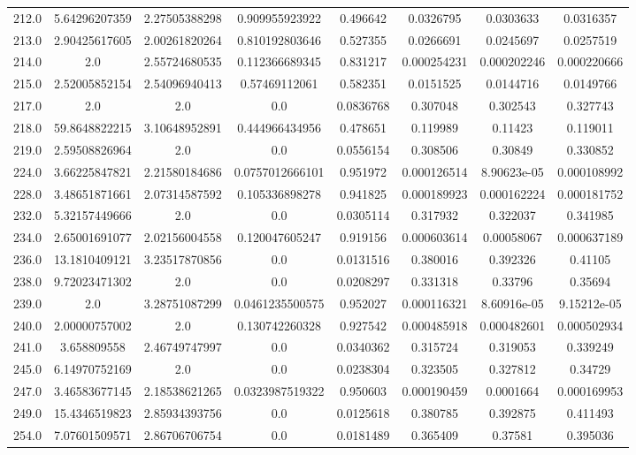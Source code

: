\begin{longtable}{|c|c|c|c|c|c|c|c|}
212.0 & 5.64296207359 & 2.27505388298 & 0.909955923922 & 0.496642 & 0.0326795 & 0.0303633 & 0.0316357 \\
213.0 & 2.90425617605 & 2.00261820264 & 0.810192803646 & 0.527355 & 0.0266691 & 0.0245697 & 0.0257519 \\
214.0 & 2.0 & 2.55724680535 & 0.112366689345 & 0.831217 & 0.000254231 & 0.000202246 & 0.000220666 \\
215.0 & 2.52005852154 & 2.54096940413 & 0.57469112061 & 0.582351 & 0.0151525 & 0.0144716 & 0.0149766 \\
217.0 & 2.0 & 2.0 & 0.0 & 0.0836768 & 0.307048 & 0.302543 & 0.327743 \\
218.0 & 59.8648822215 & 3.10648952891 & 0.444966434956 & 0.478651 & 0.119989 & 0.11423 & 0.119011 \\
219.0 & 2.59508826964 & 2.0 & 0.0 & 0.0556154 & 0.308506 & 0.30849 & 0.330852 \\
224.0 & 3.66225847821 & 2.21580184686 & 0.0757012666101 & 0.951972 & 0.000126514 & 8.90623e-05 & 0.000108992 \\
228.0 & 3.48651871661 & 2.07314587592 & 0.105336898278 & 0.941825 & 0.000189923 & 0.000162224 & 0.000181752 \\
232.0 & 5.32157449666 & 2.0 & 0.0 & 0.0305114 & 0.317932 & 0.322037 & 0.341985 \\
234.0 & 2.65001691077 & 2.02156004558 & 0.120047605247 & 0.919156 & 0.000603614 & 0.00058067 & 0.000637189 \\
236.0 & 13.1810409121 & 3.23517870856 & 0.0 & 0.0131516 & 0.380016 & 0.392326 & 0.41105 \\
238.0 & 9.72023471302 & 2.0 & 0.0 & 0.0208297 & 0.331318 & 0.33796 & 0.35694 \\
239.0 & 2.0 & 3.28751087299 & 0.0461235500575 & 0.952027 & 0.000116321 & 8.60916e-05 & 9.15212e-05 \\
240.0 & 2.00000757002 & 2.0 & 0.130742260328 & 0.927542 & 0.000485918 & 0.000482601 & 0.000502934 \\
241.0 & 3.658809558 & 2.46749747997 & 0.0 & 0.0340362 & 0.315724 & 0.319053 & 0.339249 \\
245.0 & 6.14970752169 & 2.0 & 0.0 & 0.0238304 & 0.323505 & 0.327812 & 0.34729 \\
247.0 & 3.46583677145 & 2.18538621265 & 0.0323987519322 & 0.950603 & 0.000190459 & 0.0001664 & 0.000169953 \\
249.0 & 15.4346519823 & 2.85934393756 & 0.0 & 0.0125618 & 0.380785 & 0.392875 & 0.411493 \\
254.0 & 7.07601509571 & 2.86706706754 & 0.0 & 0.0181489 & 0.365409 & 0.37581 & 0.395036 \\

\end{longtable}
